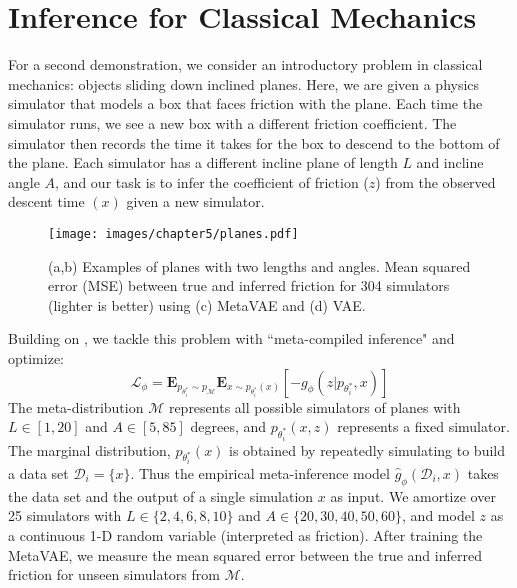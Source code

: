 \section{Inference for Classical Mechanics}

For a second demonstration, we consider an introductory problem in classical mechanics: objects sliding down inclined planes. Here, we are given a physics simulator that models a box that faces friction with the plane. 
Each time the simulator runs, we see a new box with a different friction coefficient. The simulator then records the time it takes for the box to descend to the bottom of the plane. 
Each simulator has a different incline plane of length $L$ and incline angle $A$, and our task is to infer the coefficient of friction ($z$) from the observed descent time $(x)$ given a new simulator. 
\begin{figure}[h!]
\centering     %
\texttt{[image: images/chapter5/planes.pdf]}
\caption{(a,b) Examples of planes with two lengths and angles. Mean squared error (MSE) between true and inferred friction for 304 simulators (lighter is better) using (c) MetaVAE and (d) VAE.}
\label{fig:physics}
\end{figure}
Building on \cite{le2016inference}, we tackle this problem with ``meta-compiled inference" and optimize: 
\begin{equation}
    \mathcal{L}_{\phi} = \mathbf{E}_{p_{\theta_i^*} \sim p_{\mathcal{M}}} \mathbf{E}_{x \sim p_{\theta_i^*}(x)}\left[-g_\phi(z| p_{\theta_i^*}, x) \right]
\end{equation}
The meta-distribution $\mathcal{M}$ represents all possible simulators of planes with $L \in [1,20]$ and $A \in [5,85]$ degrees, and $p_{\theta_i^*}(x, z)$ represents a fixed simulator. The marginal distribution, $p_{\theta_i^*}(x)$ is obtained by repeatedly simulating to build a data set $\mathcal{D}_i = \{ x \}$. Thus the empirical meta-inference model $\hat{g}_\phi(\mathcal{D}_i, x)$ takes the data set and the output of a single simulation $x$ as input. We amortize over 25 simulators with $L \in \{2,4,6,8,10\}$ and $A \in \{20,30,40,50,60\}$, and model $z$ as a continuous 1-D random variable (interpreted as friction). After training the MetaVAE, we measure the mean squared error between the true and inferred friction for unseen simulators from $\mathcal{M}$.
